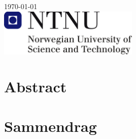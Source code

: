 \documentclass[12pt, a4paper, twoside, openright]{report}
\numberwithin{equation}{chapter}
\numberwithin{figure}{chapter}
\numberwithin{table}{chapter}
\begin{document}
\begin{titlepage}


{\large \today}\\[3cm] %


\includegraphics[width=0.5\textwidth]{Figures/ntnu-logo.png} %
 

\vfill %

\end{titlepage}
\cleardoublepage



\chapter*{Abstract}
\newpage

\chapter*{Sammendrag}
\newpage
\end{document}
